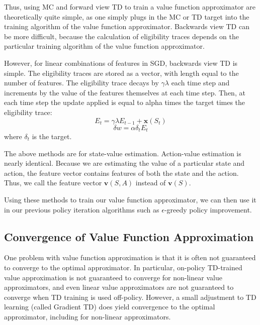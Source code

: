 \documentclass{article}
\newcommand{\eps}{\epsilon}
\begin{document}
Thus, using MC and forward view TD to train a value function approximator are theoretically quite simple, as one simply plugs in the MC or TD target into the training algorithm of the value function approximator. Backwards view TD can be more difficult, because the calculation of eligibility traces depends on the particular training algorithm of the value function approximator.

However, for linear combinations of features in SGD, backwards view TD is simple. The eligibility traces are stored as a vector, with length equal to the number of features. The eligibility trace decays by $\gamma\lambda$ each time step and increments by the value of the features themselves at each time step. Then, at each time step the update applied is equal to alpha times the target times the eligibility trace:
\begin{equation}\label{eq:incremental_eligibility_trace_update}
E_t = \gamma\lambda E_{t-1} + \mathbf{x}(S_t)
\end{equation}
\begin{equation}\label{eq:backwards_td_state_value_estimation_update}
\delta w = \alpha\delta_t E_t
\end{equation}
where $\delta_t$ is the target.

The above methods are for state-value estimation. Action-value estimation is nearly identical. Because we are estimating the value of a particular state and action, the feature vector contains features of both the state and the action. Thus, we call the feature vector $\mathbf{v}(S, A)$ instead of $\mathbf{v}(S)$.

Using these methods to train our value function approximator, we can then use it in our previous policy iteration algorithms such as $\eps$-greedy policy improvement.

\subsection{Convergence of Value Function Approximation}

One problem with value function approximation is that it is often not guaranteed to converge to the optimal approximator. In particular, on-policy TD-trained value approximation is not guaranteed to converge for non-linear value approximators, and even linear value approximators are not guaranteed to converge when TD training is used off-policy. However, a small adjustment to TD learning (called Gradient TD) does yield convergence to the optimal approximator, including for non-linear approximators.
\end{document}
